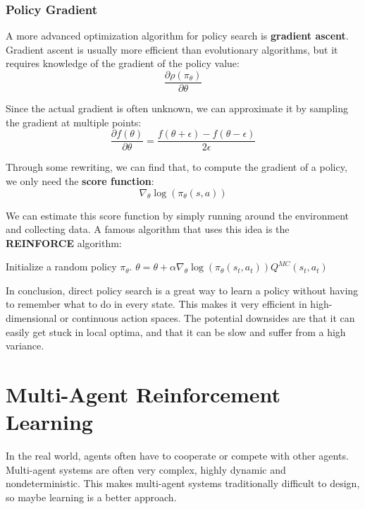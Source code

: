 \documentclass[12pt]{article}
\begin{document}
\subsubsection{Policy Gradient}
A more advanced optimization algorithm for policy search is \textbf{gradient ascent}.
Gradient ascent is usually more efficient than evolutionary algorithms, but it requires knowledge of the gradient of the policy value:
\[ \frac{\partial \rho(\pi_\theta)}{\partial \theta} \]

\noindent
Since the actual gradient is often unknown, we can approximate it by sampling the gradient at multiple points:
\[ \frac{\partial f(\theta)}{\partial \theta} = \frac{f(\theta + \epsilon) - f(\theta - \epsilon)}{2 \epsilon} \]

\noindent
Through some rewriting, we can find that, to compute the gradient of a policy, we only need the \textbf{score function}:
\[ \nabla_\theta \log(\pi_\theta(s, a)) \]

\noindent
We can estimate this score function by simply running around the environment and collecting data.
A famous algorithm that uses this idea is the \textbf{REINFORCE} algorithm:

\begin{algorithm}
    \caption{REINFORCE}
    \begin{algorithmic}[1]
        \State Initialize a random policy $\pi_\theta$.
         
             
                \State $\theta = \theta + \alpha \nabla_\theta \log(\pi_\theta(s_t, a_t)) Q^{MC}(s_t, a_t)$ 
            \EndFor
        \EndWhile
    \end{algorithmic}
\end{algorithm}

\noindent
In conclusion, direct policy search is a great way to learn a policy without having to remember what to do in every state.
This makes it very efficient in high-dimensional or continuous action spaces.
The potential downsides are that it can easily get stuck in local optima, and that it can be slow and suffer from a high variance.

%
%
\newpage
\section{Multi-Agent Reinforcement Learning}
In the real world, agents often have to cooperate or compete with other agents.
Multi-agent systems are often very complex, highly dynamic and nondeterministic.
This makes multi-agent systems traditionally difficult to design, so maybe learning is a better approach.
\end{document}
